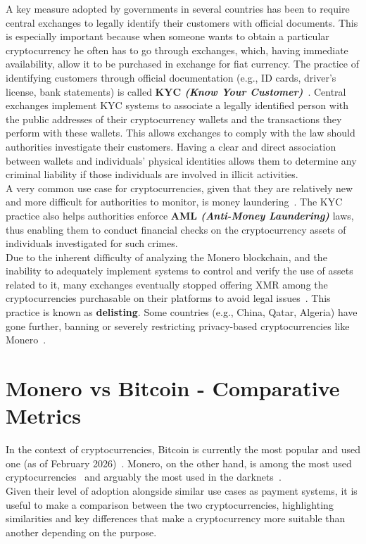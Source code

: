 \documentclass[conference]{IEEEtran}
\begin{document}
A key measure adopted by governments in several countries has been to require central exchanges to legally identify their customers with official documents. This is especially important because when someone wants to obtain a particular cryptocurrency he often has to go through exchanges, which, having immediate availability, allow it to be purchased in exchange for fiat currency. The practice of identifying customers through official documentation (e.g., ID cards, driver's license, bank statements) is called \textbf{KYC \textit{(Know Your Customer)}}~\cite{kyc}. Central exchanges implement KYC systems to associate a legally identified person with the public addresses of their cryptocurrency wallets and the transactions they perform with these wallets. This allows exchanges to comply with the law should authorities investigate their customers. Having a clear and direct association between wallets and individuals' physical identities allows them to determine any criminal liability if those individuals are involved in illicit activities.\\
A very common use case for cryptocurrencies, given that they are relatively new and more difficult for authorities to monitor, is money laundering~\cite{crypto_money_laundering}. The KYC practice also helps authorities enforce \textbf{AML \textit{(Anti-Money Laundering)}} laws, thus enabling them to conduct financial checks on the cryptocurrency assets of individuals investigated for such crimes.\\

Due to the inherent difficulty of analyzing the Monero blockchain, and the inability to adequately implement systems to control and verify the use of assets related to it, many exchanges eventually stopped offering XMR among the cryptocurrencies purchasable on their platforms to avoid legal issues~\cite{monero_delisting_kraken, monero_delisting_binance, monero_delisting_okx}. This practice is known as \textbf{delisting}. Some countries (e.g., China, Qatar, Algeria) have gone further, banning or severely restricting privacy-based cryptocurrencies like Monero~\cite{monero_illegal}.



\section{Monero vs Bitcoin - Comparative Metrics}
In the context of cryptocurrencies, Bitcoin is currently the most popular and used one (as of February 2026)~\cite{coin_market_cap}. Monero, on the other hand, is among the most used cryptocurrencies~\cite{coin_market_cap} and arguably the most used in the darknets~\cite{monero_illegal_usage}.\\
Given their level of adoption alongside similar use cases as payment systems, it is useful to make a comparison between the two cryptocurrencies, highlighting similarities and key differences that make a cryptocurrency more suitable than another depending on the purpose.
\end{document}
